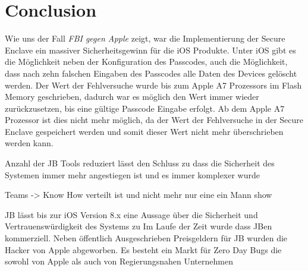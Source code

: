 %
%
%
% 


\chapter{Conclusion}
\label{ch:Conclusion}

Wie uns der Fall \textit{\glqq FBI gegen Apple\grqq{}} zeigt, war die Implementierung der Secure Enclave ein massiver Sicherheitsgewinn für die iOS Produkte. Unter iOS gibt es die Möglichkeit neben der Konfiguration des Passcodes, auch die Möglichkeit, dass nach zehn falschen Eingaben des Passcodes alle Daten des Devices gelöscht werden. Der Wert der Fehlversuche wurde bis zum Apple A7 Prozessors im Flash Memory geschrieben, dadurch war es möglich den Wert immer wieder zurückzusetzen, bis eine gültige Passcode Eingabe erfolgt. Ab dem Apple A7 Prozessor ist dies nicht mehr möglich, da der Wert der Fehlversuche in der Secure Enclave gespeichert werden und somit dieser Wert nicht mehr überschrieben werden kann. 

Anzahl der JB Tools reduziert lässt den Schluss zu dass die Sicherheit des Systemen immer mehr angestiegen ist und es immer komplexer wurde 

Teams -> Know How verteilt ist und nicht mehr nur eine ein Mann show

JB lässt bis zur iOS Version 8.x eine Aussage über die Sicherheit und Vertrauenswürdigkeit des Systems zu
Im Laufe der Zeit wurde dass JBen kommerziell. Neben öffentlich Ausgeschrieben Preisgeldern für JB wurden die Hacker von Apple abgeworben. Es besteht ein Markt für Zero Day Bugs die sowohl von Apple als auch von Regierungsnahen Unternehmen 


